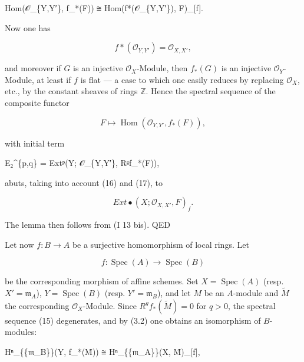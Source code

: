 \documentclass[
]{article}
\newenvironment{Shaded}{}{}
\newcommand{\NormalTok}[1]{#1}
\begin{document}
\begin{Shaded}
\begin{Highlighting}[]
\NormalTok{Hom(𝒪\_\{Y,Y′\}, f\_*(F)) ≅ Hom(f*(𝒪\_\{Y,Y′\}), F)\_[f].}
\end{Highlighting}
\end{Shaded}

Now one has

\[
f*(\mathcal{O}_{Y,Y'}) = \mathcal{O}_{X,X'},
\]

and moreover if \(G\) is an injective \(\mathcal{O}_{X}\)-Module, then
\(f_{*}(G)\) is an injective \(\mathcal{O}_{Y}\)-Module, at least if
\(f\) is flat --- a case to which one easily reduces by replacing
\(\mathcal{O}_{X}\), etc., by the constant sheaves of rings
\(\mathbb{Z}\). Hence the spectral sequence of the composite functor

\[
F \mapsto \operatorname{Hom}(\mathcal{O}_{Y,Y'}, f_{*}(F)),
\]

with initial term

\begin{Shaded}
\begin{Highlighting}[]
\NormalTok{E₂\^{}\{p,q\} = Extᵖ(Y; 𝒪\_\{Y,Y′\}, Rᵍf\_*(F)),}
\end{Highlighting}
\end{Shaded}

abuts, taking into account (16) and (17), to

\[
Ext\bullet(X; \mathcal{O}_{X,X'}, F)_{f}.
\]

The lemma then follows from (I 13 bis). QED

Let now \(f: B \to A\) be a surjective homomorphism of local rings. Let

\[
f: \operatorname{Spec}(A) \to \operatorname{Spec}(B)
\]

be the corresponding morphism of affine schemes. Set
\(X = \operatorname{Spec}(A)\) (resp. \(X' = {\mathfrak{m}_{A}}\)),
\(Y = \operatorname{Spec}(B)\) (resp. \(Y' = {\mathfrak{m}_{B}}\)), and
let \(M\) be an \(A\)-module and \(\tilde{M}\) the corresponding
\(\mathcal{O}_{X}\)-Module. Since \(R^{g}f_{*}(\tilde{M}) = 0\) for
\(q > 0\), the spectral sequence (15) degenerates, and by (3.2) one
obtains an isomorphism of \(B\)-modules:

\begin{Shaded}
\begin{Highlighting}[]
\NormalTok{Hⁿ\_\{\{𝔪\_B\}\}(Y, f\_*(M̃)) ≅ Hⁿ\_\{\{𝔪\_A\}\}(X, M̃)\_[f],}
\end{Highlighting}
\end{Shaded}
\end{document}
